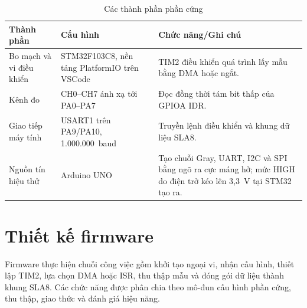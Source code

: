 \begin{longtable}[]{@{}|
  >{\raggedright\arraybackslash}p{}
  |>{\raggedright\arraybackslash}p{}
  |>{\raggedright\arraybackslash}p{}|@{}}
\caption{Các thành phần phần cứng}\tabularnewline
\hline
\textbf{Thành phần} & \textbf{Cấu hình} & \textbf{Chức năng/Ghi chú} \\ \hline

Bo mạch và vi điều khiển & STM32F103C8, nền tảng PlatformIO trên VSCode & TIM2 điều khiển quá trình lấy mẫu bằng DMA hoặc ngắt. \\ \hline
Kênh đo & CH0--CH7 ánh xạ tới PA0--PA7 & Đọc đồng thời tám bit thấp của GPIOA IDR. \\ \hline
Giao tiếp máy tính & USART1 trên PA9/PA10, 1.000.000~baud & Truyền lệnh điều khiển và khung dữ liệu SLA8. \\ \hline
Nguồn tín hiệu thử & Arduino UNO & Tạo chuỗi Gray, UART, I2C và SPI bằng ngõ ra cực máng hở; mức HIGH do điện trở kéo lên 3,3~V tại STM32 tạo ra. \\ \hline

\end{longtable}

\section{Thiết kế firmware}\label{sec:firmware-design}

Firmware thực hiện chuỗi công việc gồm khởi tạo ngoại vi, nhận cấu hình, thiết lập TIM2, lựa chọn DMA hoặc ISR, thu thập mẫu và đóng gói dữ liệu thành khung SLA8. Các chức năng được phân chia theo mô-đun cấu hình phần cứng, thu thập, giao thức và đánh giá hiệu năng.

